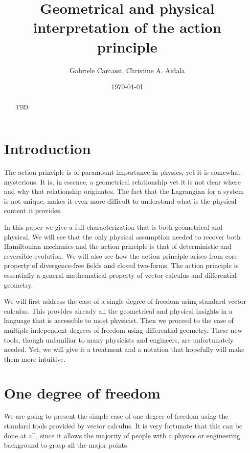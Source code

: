 \documentclass[10pt,twocolumn, nofootinbib]{revtex4-2}
\begin{document}
\title{Geometrical and physical interpretation of the action principle}
\author{Gabriele Carcassi, Christine A. Aidala}

\date{\today}


\begin{abstract}
TBD
\end{abstract}

\maketitle

\section{Introduction}

The action principle is of paramount importance in physics, yet it is somewhat mysterious. It is, in essence, a geometrical relationship yet it is not clear where and why that relationship originates. The fact that the Lagrangian for a system is not unique, makes it even more difficult to understand what is the physical content it provides.

In this paper we give a full characterization that is both geometrical and physical. We will see that the only physical assumption needed to recover both Hamiltonian mechanics and the action principle is that of deterministic and reversible evolution. We will also see how the action principle arises from core property of divergence-free fields and closed two-forms. The action principle is essentially a general mathematical property of vector calculus and differential geometry.

We will first address the case of a single degree of freedom using standard vector calculus. This provides already all the geometrical and physical insights in a language that is accessible to most physicist. Then we proceed to the case of multiple independent degrees of freedom using differential geometry. These new tools, though unfamiliar to many physicists and engineers, are unfortunately needed. Yet, we will give it a treatment and a notation that hopefully will make them more intuitive.

\section{One degree of freedom}

We are going to present the simple case of one degree of freedom using the standard tools provided by vector calculus. It is very fortunate that this can be done at all, since it allows the majority of people with a physics or engineering background to grasp all the major points.
\end{document}
